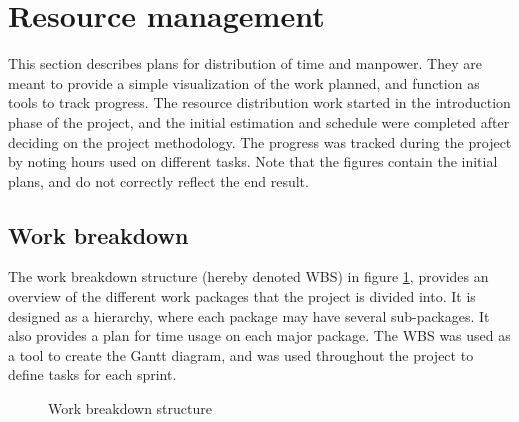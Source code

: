 \section{Resource management}
\label{sec:process_and_methodology-resource_management}

This section describes plans for distribution of time and manpower. They are meant to provide a simple visualization of the work planned, and function as tools to track progress. The resource distribution work started in the introduction phase of the project, and the initial estimation and schedule were completed after deciding on the project methodology. The progress was tracked during the project by noting hours used on different tasks. Note that the figures contain the initial plans, and do not correctly reflect the end result.

\subsection{Work breakdown}
\label{subsec:process_and_methodology-resource_management-work_breakdown}

The work breakdown structure (hereby denoted WBS) in figure \ref{fig:Work breakdown structure}, provides an overview of the different work packages that the project is divided into. It is designed as a hierarchy, where each package may have several sub-packages. It also provides a plan for time usage on each major package. The WBS was used as a tool to create the Gantt diagram, and was used throughout the project to define tasks for each sprint.

\begin{center}
  \begin{figure}[ht!]
    \caption{Work breakdown structure}
    \label{fig:Work breakdown structure}
  \end{figure}
\end{center}

